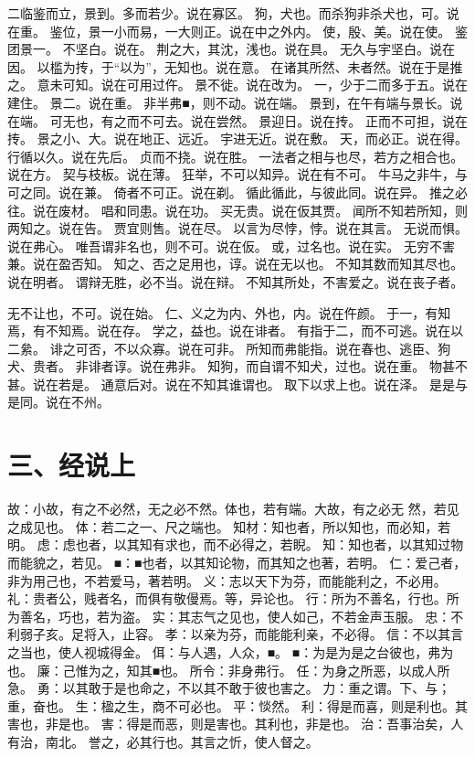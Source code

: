 \documentclass[12pt,UTF8]{ctexbook}
\begin{document}
二临鉴而立，景到。多而若少。说在寡区。 
狗，犬也。而杀狗非杀犬也，可。说在重。 
鉴位，景一小而易，一大则正。说在中之外内。 
使，殷、美。说在使。 
鉴团景一。 
不坚白。说在。 
荆之大，其沈，浅也。说在具。 
无久与宇坚白。说在因。 
以槛为抟，于“以为”，无知也。说在意。 
在诸其所然、未者然。说在于是推之。 
意未可知。说在可用过仵。 
景不徙。说在改为。 
一，少于二而多于五。说在建住。 
景二。说在重。 
非半弗■，则不动。说在端。 
景到，在午有端与景长。说在端。 
可无也，有之而不可去。说在尝然。 
景迎日。说在抟。 
正而不可担，说在抟。 
景之小、大。说在地正、远近。 
宇进无近。说在敷。 
天，而必正。说在得。 
行循以久。说在先后。 
贞而不挠。说在胜。 
一法者之相与也尽，若方之相合也。说在方。 
契与枝板。说在薄。 
狂举，不可以知异。说在有不可。 
牛马之非牛，与可之同。说在兼。 
倚者不可正。说在剃。 
循此循此，与彼此同。说在异。 
推之必往。说在废材。 
唱和同患。说在功。 
买无贵。说在仮其贾。 
闻所不知若所知，则两知之。说在告。 
贾宜则售。说在尽。 
以言为尽悖，悖。说在其言。 
无说而惧。说在弗心。 
唯吾谓非名也，则不可。说在仮。 
或，过名也。说在实。 
无穷不害兼。说在盈否知。 
知之、否之足用也，谆。说在无以也。 
不知其数而知其尽也。说在明者。 
谓辩无胜，必不当。说在辩。 
不知其所处，不害爱之。说在丧子者。 

无不让也，不可。说在始。 
仁、义之为内、外也，内。说在仵颜。 
于一，有知焉，有不知焉。说在存。 
学之，益也。说在诽者。 
有指于二，而不可逃。说在以二絫。 
诽之可否，不以众寡。说在可非。 
所知而弗能指。说在春也、逃臣、狗犬、贵者。 
非诽者谆。说在弗非。 
知狗，而自谓不知犬，过也。说在重。 
物甚不甚。说在若是。 
通意后对。说在不知其谁谓也。 
取下以求上也。说在泽。 
是是与是同。说在不州。 


\chapter{三、经说上}

故：小故，有之不必然，无之必不然。体也，若有端。大故，有之必无 
然，若见之成见也。 
体：若二之一、尺之端也。 
知材：知也者，所以知也，而必知，若明。 
虑：虑也者，以其知有求也，而不必得之，若睨。 
知：知也者，以其知过物而能貌之，若见。 
■：■也者，以其知论物，而其知之也著，若明。 
仁：爱己者，非为用己也，不若爱马，著若明。 
义：志以天下为芬，而能能利之，不必用。 
礼：贵者公，贱者名，而俱有敬僈焉。等，异论也。 
行：所为不善名，行也。所为善名，巧也，若为盗。 
实：其志气之见也，使人如己，不若金声玉服。 
忠：不利弱子亥。足将入，止容。 
孝：以亲为芬，而能能利亲，不必得。 
信：不以其言之当也，使人视城得金。 
佴：与人遇，人众，■。 
■：为是为是之台彼也，弗为也。 
廉：己惟为之，知其■也。 
所令：非身弗行。 
任：为身之所恶，以成人所急。 
勇：以其敢于是也命之，不以其不敢于彼也害之。 
力：重之谓。下、与；重，奋也。 
生：楹之生，商不可必也。 
平：惔然。 
利：得是而喜，则是利也。其害也，非是也。 
害：得是而恶，则是害也。其利也，非是也。 
治：吾事治矣，人有治，南北。 
誉之，必其行也。其言之忻，使人督之。 
\end{document}
